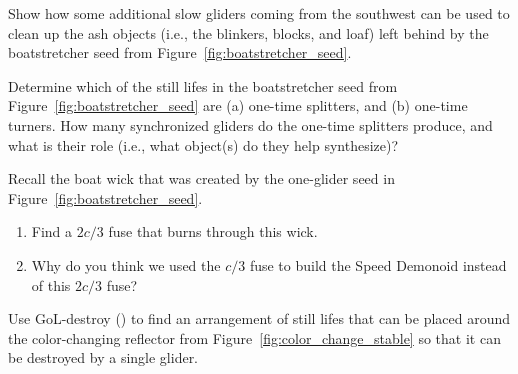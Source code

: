 \begin{multicols}{2}
\begin{problem}
	\end{problem}


	\mfilbreak
	
	
	\begin{problem}\label{exer:boatstretcher_seed_slow_cleanup}
		Show how some additional slow gliders coming from the southwest can be used to clean up the ash objects (i.e., the blinkers, blocks, and loaf) left behind by the boatstretcher seed from Figure~\ref{fig:boatstretcher_seed}.
	\end{problem}


	\mfilbreak
	
	
	\begin{problem}\label{exer:boatstretcher_seed_identify}
		Determine which of the still lifes in the boatstretcher seed from Figure~\ref{fig:boatstretcher_seed} are (a) one-time splitters, and (b) one-time turners. How many synchronized gliders do the one-time splitters produce, and what is their role (i.e., what object(s) do they help synthesize)?
	\end{problem}
	
	
	\mfilbreak
	
	
	\begin{problem}\label{exer:boatstretcher_2c3_fuse}
		Recall the boat wick that was created by the one-glider seed in Figure~\ref{fig:boatstretcher_seed}.
		
		\begin{enumerate}[label=\bf\color{ocre}(\alph*)]
			\item Find a $2c/3$ fuse that burns through this wick.
			
			
			\item Why do you think we used the $c/3$ fuse to build the Speed Demonoid instead of this $2c/3$ fuse?
		\end{enumerate}
	\end{problem}


	\mfilbreak
	
	
	\begin{problem}\label{exer:use_gol_destroy}
		Use GoL-destroy () to find an arrangement of still lifes that can be placed around the color-changing reflector from Figure~\ref{fig:color_change_stable} so that it can be destroyed by a single glider.
	\end{problem}

\end{multicols}
\normalsize\vspace*{0.01cm}
